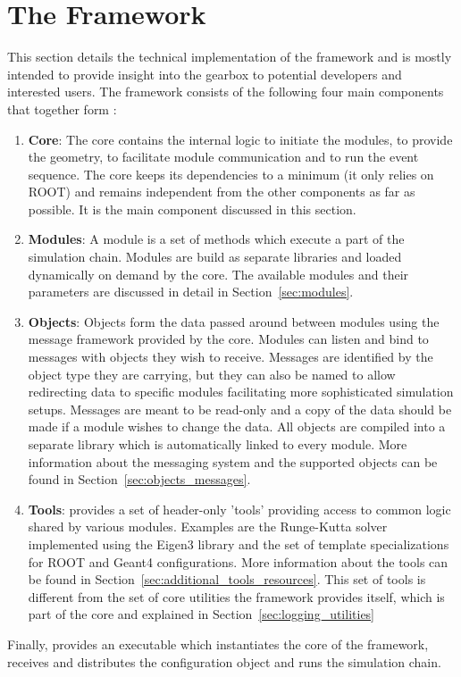 \section{The \apsq Framework}
\label{sec:framework}
This section details the technical implementation of the \apsq framework and is mostly intended to provide insight into the gearbox to potential developers and interested users.
The framework consists of the following four main components that together form \apsq:
\begin{enumerate}
\item \textbf{Core}: The core contains the internal logic to initiate the modules, to provide the geometry, to facilitate module communication and to run the event sequence.
The core keeps its dependencies to a minimum (it only relies on ROOT) and remains independent from the other components as far as possible.
It is the main component discussed in this section.
\item \textbf{Modules}: A module is a set of methods which execute a part of the simulation chain.
Modules are build as separate libraries and loaded dynamically on demand by the core.
The available modules and their parameters are discussed in detail in Section~\ref{sec:modules}.
\item \textbf{Objects}: Objects form the data passed around between modules using the message framework provided by the core.
Modules can listen and bind to messages with objects they wish to receive.
Messages are identified by the object type they are carrying, but they can also be named to allow redirecting data to specific modules facilitating more sophisticated simulation setups.
Messages are meant to be read-only and a copy of the data should be made if a module wishes to change the data.
All objects are compiled into a separate library which is automatically linked to every module.
More information about the messaging system and the supported objects can be found in Section~\ref{sec:objects_messages}.
\item \textbf{Tools}: \apsq provides a set of header-only 'tools' providing access to common logic shared by various modules.
Examples are the Runge-Kutta solver implemented using the Eigen3 library and the set of template specializations for ROOT and Geant4 configurations.
More information about the tools can be found in Section~\ref{sec:additional_tools_resources}.
This set of tools is different from the set of core utilities the framework provides itself, which is part of the core and explained in Section~\ref{sec:logging_utilities}
\end{enumerate}
Finally, \apsq provides an executable which instantiates the core of the framework, receives and distributes the configuration object and runs the simulation chain.

